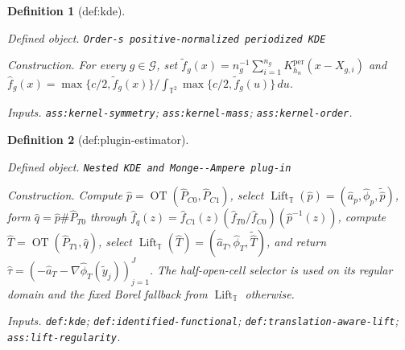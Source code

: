 \documentclass{article}
\newtheorem{definition}{Definition}
\begin{document}
\begin{definition}[def:kde]\label{def:kde}
\par\smallskip\noindent\emph{Defined object.} \texttt{Order-\allowbreak{}s positive-\allowbreak{}normalized periodized KDE}
\par\smallskip\noindent\emph{Construction.} For every \(g\in\mathcal G\), set \(\widetilde f_g(x)=n_g^{-1}\sum_{i=1}^{n_g}K_{h_n}^{\mathrm{per}}(x-X_{g,i})\) and \(\widehat f_g(x)=\max\{c/2,\widetilde f_g(x)\}/\int_{\mathbb T^2}\max\{c/2,\widetilde f_g(u)\}\,du\).
\par\smallskip\noindent\emph{Inputs.} \texttt{ass:\allowbreak{}kernel-\allowbreak{}symmetry}; \texttt{ass:\allowbreak{}kernel-\allowbreak{}mass}; \texttt{ass:\allowbreak{}kernel-\allowbreak{}order}.
\end{definition}

\begin{definition}[def:plugin-estimator]\label{def:plugin-estimator}
\par\smallskip\noindent\emph{Defined object.} \texttt{Nested KDE and Monge-\allowbreak{}-\allowbreak{}Ampere plug-\allowbreak{}in}
\par\smallskip\noindent\emph{Construction.} Compute \(\widehat p=\operatorname{OT}(\widehat P_{C0},\widehat P_{C1})\), select \(\operatorname{Lift}_{\mathbb T}(\widehat p)=(\widehat a_p,\widehat\phi_p,\widetilde{\widehat p})\), form \(\widehat q=\widehat p\#\widehat P_{T0}\) through \(\widehat f_q(z)=\widehat f_{C1}(z)(\widehat f_{T0}/\widehat f_{C0})(\widehat p^{-1}(z))\), compute \(\widehat T=\operatorname{OT}(\widehat P_{T1},\widehat q)\), select \(\operatorname{Lift}_{\mathbb T}(\widehat T)=(\widehat a_T,\widehat\phi_T,\widetilde{\widehat T})\), and return \(\widehat\tau=(-\widehat a_T-\nabla\widehat\phi_T(\widetilde y_j))_{j=1}^J\). The half-open-cell selector is used on its regular domain and the fixed Borel fallback from \(\operatorname{Lift}_{\mathbb T}\) otherwise.
\par\smallskip\noindent\emph{Inputs.} \texttt{def:\allowbreak{}kde}; \texttt{def:\allowbreak{}identified-\allowbreak{}functional}; \texttt{def:\allowbreak{}translation-\allowbreak{}aware-\allowbreak{}lift}; \texttt{ass:\allowbreak{}lift-\allowbreak{}regularity}.
\end{definition}
\end{document}
